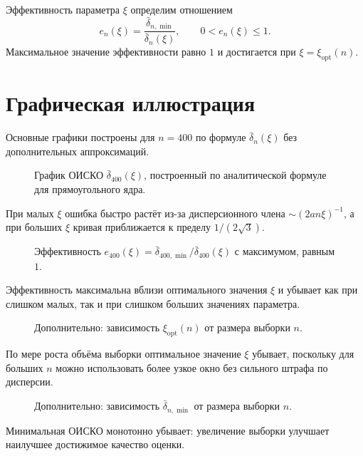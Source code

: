 Эффективность параметра $\xi$ определим отношением
\[
e_n(\xi)=\frac{\bar{\delta}_{n,\min}}{\bar{\delta}_n(\xi)},
\qquad 0<e_n(\xi)\le 1.
\]
Максимальное значение эффективности равно $1$ и достигается при
$\xi=\xi_{\mathrm{opt}}(n)$.

\section*{Графическая иллюстрация}

Основные графики построены для $n=400$ по формуле
$\bar{\delta}_n(\xi)$ без дополнительных аппроксимаций.

\begin{figure}[H]
\centering
{}
\caption{График ОИСКО $\bar{\delta}_{400}(\xi)$, построенный по аналитической формуле для прямоугольного ядра.}
\end{figure}

При малых $\xi$ ошибка быстро растёт из-за дисперсионного члена
$\sim (2an\xi)^{-1}$, а при больших $\xi$ кривая приближается к пределу
$1/(2\sqrt{3})$.

\begin{figure}[H]
\centering
{}
\caption{Эффективность $e_{400}(\xi)=\bar{\delta}_{400,\min}/\bar{\delta}_{400}(\xi)$ с максимумом, равным $1$.}
\end{figure}

Эффективность максимальна вблизи оптимального значения $\xi$ и убывает как
при слишком малых, так и при слишком больших значениях параметра.

\begin{figure}[H]
\centering
{}
\caption{Дополнительно: зависимость $\xi_{\mathrm{opt}}(n)$ от размера выборки $n$.}
\end{figure}

По мере роста объёма выборки оптимальное значение $\xi$ убывает, поскольку
для больших $n$ можно использовать более узкое окно без сильного штрафа по
дисперсии.

\begin{figure}[H]
\centering
{}
\caption{Дополнительно: зависимость $\bar{\delta}_{n,\min}$ от размера выборки $n$.}
\end{figure}

Минимальная ОИСКО монотонно убывает: увеличение выборки улучшает наилучшее
достижимое качество оценки.
